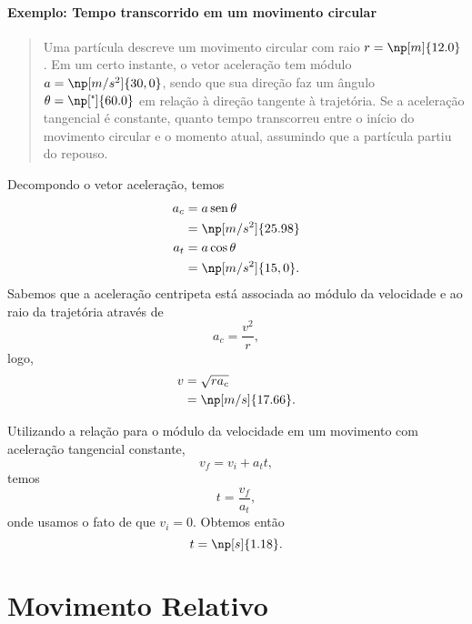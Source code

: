 \paragraph{Exemplo: Tempo transcorrido em um movimento circular}

\begin{quote}
	Uma partícula descreve um movimento circular com raio $r = \np[m]{12.0}$. Em um certo instante, o vetor aceleração tem módulo $a = \np[m/s^2]{30,0}$, sendo que sua direção faz um ângulo $\theta = \np[\tcdegree]{60.0}$ em relação à direção tangente à trajetória. Se a aceleração tangencial é constante, quanto tempo transcorreu entre o início do movimento circular e o momento atual, assumindo que a partícula partiu do repouso.
\end{quote}

Decompondo o vetor aceleração, temos
\begin{align}
	a_c &= a\sen\theta \\
	&= \np[m/s^2]{25.98} \\
	a_t &= a\cos\theta \\
	&= \np[m/s^2]{15,0}.
\end{align}
%
Sabemos que a aceleração centripeta está associada ao módulo da velocidade e ao raio da trajetória através de
\begin{equation}
	a_c = \frac{v^2}{r},
\end{equation}
%
logo,
\begin{align}
	v &= \sqrt{r a_c} \\
	&= \np[m/s]{17.66}.
\end{align}

Utilizando a relação para o módulo da velocidade em um movimento com aceleração tangencial constante,
\begin{equation}
	v_f = v_i + a_t t,
\end{equation}
%
temos
\begin{equation}
	t = \frac{v_f}{a_t},
\end{equation}
%
onde usamos o fato de que $v_i = 0$. Obtemos então
\begin{equation}
	t = \np[s]{1.18}.
\end{equation}

\section{Movimento Relativo}

